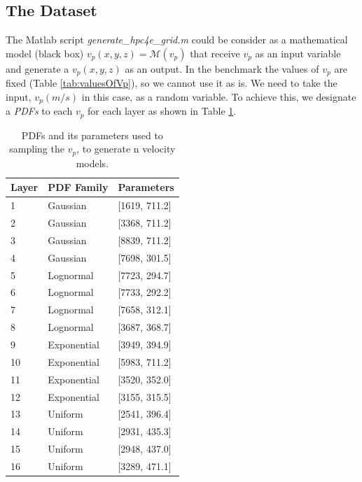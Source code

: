 \subsection{The Dataset}
The Matlab script \textit{generate\_hpc4e\_grid.m} could be consider as a mathematical model (black box) $v_{p}(x,y,z) = \mathcal{M}(v_{p})$ that receive $v_{p}$ as an input variable and generate a $v_{p}(x,y,z)$ as an output. In the benchmark the values of $v_{p}$ are fixed (Table \ref{tab:valuesOfVp}), so we cannot use it as is. We need to take the input, $v_{p}(m/s)$  in this case, as a random variable. To achieve this, we designate a \textit{PDFs} to each $v_{p}$ for each layer as shown in Table \ref{tab:PDFsOfVp}.

\begin{table}[ht]
\begin{center}
    \begin{tabular}{|l|l|l|}
    \hline
    \textbf{Layer} & \textbf{PDF Family}                & \textbf{Parameters}           \\ \hline
    1     & Gaussian & [1619, 711.2] \\ \hline
    2     & Gaussian & [3368, 711.2]               \\ \hline
    3     & Gaussian & [8839, 711.2]               \\ \hline
    4     & Gaussian & [7698, 301.5]               \\ \hline
    5     & Lognormal   & [7723, 294.7]               \\ \hline
    6     & Lognormal   & [7733, 292.2]               \\ \hline
    7     & Lognormal   & [7658, 312.1]               \\ \hline
    8     & Lognormal   & [3687, 368.7]               \\ \hline
    9     & Exponential & [3949, 394.9]             \\ \hline
    10   & Exponential & [5983, 711.2]               \\ \hline
    11   & Exponential & [3520, 352.0]              \\ \hline
    12   & Exponential & [3155, 315.5]              \\ \hline
    13   & Uniform     & [2541, 396.4]              \\ \hline
    14   & Uniform     & [2931, 435.3]              \\ \hline
    15   & Uniform     & [2948, 437.0]             \\ \hline
    16   & Uniform     & [3289, 471.1]              \\ \hline
    \end{tabular}
    \caption {PDFs and its parameters used to sampling the $v_{p}$, to generate n velocity models.}
    \label{tab:PDFsOfVp}
    \end{center}
\end{table}

